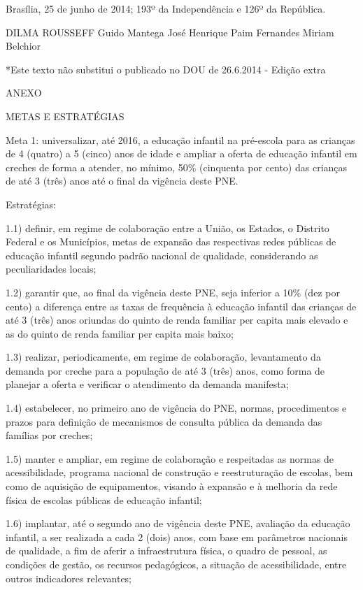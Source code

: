 \documentclass[
]{book}
\begin{document}
Brasília, 25 de junho de 2014; 193º da Independência e 126º da República.

DILMA ROUSSEFF
Guido Mantega
José Henrique Paim Fernandes
Miriam Belchior

*Este texto não substitui o publicado no DOU de 26.6.2014 - Edição extra

ANEXO

METAS E ESTRATÉGIAS

Meta 1: universalizar, até 2016, a educação infantil na pré-escola para as crianças de 4 (quatro) a 5 (cinco) anos de idade e ampliar a oferta de educação infantil em creches de forma a atender, no mínimo, 50\% (cinquenta por cento) das crianças de até 3 (três) anos até o final da vigência deste PNE.

Estratégias:

1.1) definir, em regime de colaboração entre a União, os Estados, o Distrito Federal e os Municípios, metas de expansão das respectivas redes públicas de educação infantil segundo padrão nacional de qualidade, considerando as peculiaridades locais;

1.2) garantir que, ao final da vigência deste PNE, seja inferior a 10\% (dez por cento) a diferença entre as taxas de frequência à educação infantil das crianças de até 3 (três) anos oriundas do quinto de renda familiar per capita mais elevado e as do quinto de renda familiar per capita mais baixo;

1.3) realizar, periodicamente, em regime de colaboração, levantamento da demanda por creche para a população de até 3 (três) anos, como forma de planejar a oferta e verificar o atendimento da demanda manifesta;

1.4) estabelecer, no primeiro ano de vigência do PNE, normas, procedimentos e prazos para definição de mecanismos de consulta pública da demanda das famílias por creches;

1.5) manter e ampliar, em regime de colaboração e respeitadas as normas de acessibilidade, programa nacional de construção e reestruturação de escolas, bem como de aquisição de equipamentos, visando à expansão e à melhoria da rede física de escolas públicas de educação infantil;

1.6) implantar, até o segundo ano de vigência deste PNE, avaliação da educação infantil, a ser realizada a cada 2 (dois) anos, com base em parâmetros nacionais de qualidade, a fim de aferir a infraestrutura física, o quadro de pessoal, as condições de gestão, os recursos pedagógicos, a situação de acessibilidade, entre outros indicadores relevantes;
\end{document}
